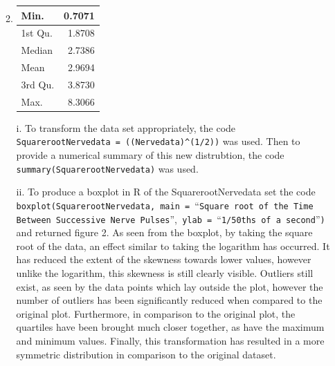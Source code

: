 \documentclass[a4paper]{article}
\newcommand{\code}{\texttt}
\begin{document}
\begin{enumerate}
\begin{enumerate}
\begin{adjustbox}{valign=T,raise=0ex,minipage={\linewidth}}
	    \end{adjustbox}

	    \pagebreak

		\item 
		\begin{adjustbox}{valign=T,raise=0ex,minipage={\linewidth}}
	        \begin{table}
				\begin{tabular}{l|r}
					Min. & 0.7071 \\
					\hline
					1st Qu. & 1.8708 \\
					\hline
					Median & 2.7386 \\
					\hline
					Mean & 2.9694 \\
					\hline
					3rd Qu. & 3.8730 \\
					\hline
					Max. & 8.3066 \\
				\end{tabular}
			\end{table}

    		i. To transform the data set appropriately, the code \code{SquarerootNervedata = ((Nervedata)\^{}(1/2))} was used. Then to provide a numerical summary of this new distrubtion, the code \\ \code{summary(SquarerootNervedata)} was used.

    		\bigbreak

			ii. To produce a boxplot in R of the SquarerootNervedata set the code \code{boxplot(SquarerootNervedata, main = }\enquote{\code{Square root of the Time Between Successive Nerve Pulses}},\code{ ylab = }\enquote{\code{1/50ths of a second}}\code{)} and returned figure 2. As seen from the boxplot, by taking the square root of the data, an effect similar to taking the logarithm has occurred. It has reduced the extent of the skewness towards lower values, however unlike the logarithm, this skewness is still clearly visible. Outliers still exist, as seen by the data points which lay outside the plot, however the number of outliers has been significantly reduced when compared to the original plot.  Furthermore, in comparison to the original plot, the quartiles have been brought much closer together, as have the maximum and minimum values. Finally, this transformation has resulted in a more symmetric distribution in comparison to the original dataset.

	    \end{adjustbox}


\end{enumerate}
\end{enumerate}
\end{document}
